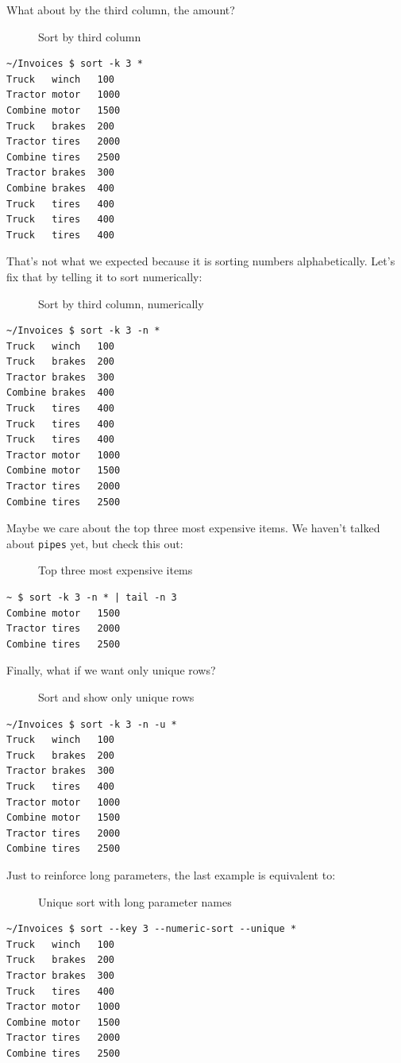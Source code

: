 \documentclass[10pt,]{book}
\numberwithin{figure}{chapter}
\DeclareRobustCommand{\drcap}[1]{\begin{figure}[H]\caption{#1}\end{figure}}
\begin{document}
What about by the third column, the amount?

\drcap{Sort by third column}

\begin{verbatim}
~/Invoices $ sort -k 3 *
Truck   winch   100
Tractor motor   1000
Combine motor   1500
Truck   brakes  200
Tractor tires   2000
Combine tires   2500
Tractor brakes  300
Combine brakes  400
Truck   tires   400
Truck   tires   400
Truck   tires   400
\end{verbatim}

That's not what we expected because it is sorting numbers
alphabetically. Let's fix that by telling it to sort numerically:

\drcap{Sort by third column, numerically}

\begin{verbatim}
~/Invoices $ sort -k 3 -n *
Truck   winch   100
Truck   brakes  200
Tractor brakes  300
Combine brakes  400
Truck   tires   400
Truck   tires   400
Truck   tires   400
Tractor motor   1000
Combine motor   1500
Tractor tires   2000
Combine tires   2500
\end{verbatim}

Maybe we care about the top three most expensive items. We haven't
talked about \texttt{pipes} yet, but check this out:

\drcap{Top three most expensive items}

\begin{verbatim}
~ $ sort -k 3 -n * | tail -n 3
Combine motor   1500
Tractor tires   2000
Combine tires   2500
\end{verbatim}

Finally, what if we want only unique rows?

\drcap{Sort and show only unique rows}

\begin{verbatim}
~/Invoices $ sort -k 3 -n -u *
Truck   winch   100
Truck   brakes  200
Tractor brakes  300
Truck   tires   400
Tractor motor   1000
Combine motor   1500
Tractor tires   2000
Combine tires   2500
\end{verbatim}

Just to reinforce long parameters, the last example is equivalent to:

\drcap{Unique sort with long parameter names}

\begin{verbatim}
~/Invoices $ sort --key 3 --numeric-sort --unique *
Truck   winch   100
Truck   brakes  200
Tractor brakes  300
Truck   tires   400
Tractor motor   1000
Combine motor   1500
Tractor tires   2000
Combine tires   2500
\end{verbatim}
\end{document}
